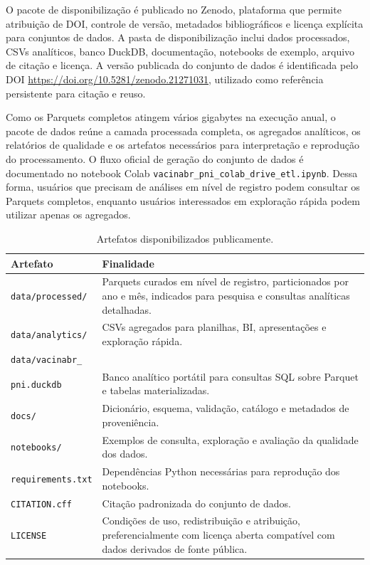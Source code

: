 \documentclass[12pt]{article}
\begin{document}
O pacote de disponibilização é publicado no Zenodo, plataforma que permite atribuição de DOI, controle de versão, metadados bibliográficos e licença explícita para conjuntos de dados. A pasta de disponibilização inclui dados processados, CSVs analíticos, banco DuckDB, documentação, notebooks de exemplo, arquivo de citação e licença. A versão publicada do conjunto de dados é identificada pelo DOI \url{https://doi.org/10.5281/zenodo.21271031}, utilizado como referência persistente para citação e reuso.

Como os Parquets completos atingem vários gigabytes na execução anual, o pacote de dados reúne a camada processada completa, os agregados analíticos, os relatórios de qualidade e os artefatos necessários para interpretação e reprodução do processamento. O fluxo oficial de geração do conjunto de dados é documentado no notebook Colab \texttt{vacinabr\_pni\_colab\_drive\_etl.ipynb}. Dessa forma, usuários que precisam de análises em nível de registro podem consultar os Parquets completos, enquanto usuários interessados em exploração rápida podem utilizar apenas os agregados.

\begin{table}[ht]
\centering
\caption{Artefatos disponibilizados publicamente.}
\label{tab:release-artifacts}
\begin{tabular}{p{4.8cm}p{6.4cm}}
\toprule
\textbf{Artefato} & \textbf{Finalidade} \\
\midrule
\texttt{data/processed/} & Parquets curados em nível de registro, particionados por ano e mês, indicados para pesquisa e consultas analíticas detalhadas. \\
\texttt{data/analytics/} & CSVs agregados para planilhas, BI, apresentações e exploração rápida. \\
\texttt{data/vacinabr\_}\\
\texttt{pni.duckdb} & Banco analítico portátil para consultas SQL sobre Parquet e tabelas materializadas. \\
\texttt{docs/} & Dicionário, esquema, validação, catálogo e metadados de proveniência. \\
\texttt{notebooks/} & Exemplos de consulta, exploração e avaliação da qualidade dos dados. \\
\texttt{requirements.txt} & Dependências Python necessárias para reprodução dos notebooks. \\
\texttt{CITATION.cff} & Citação padronizada do conjunto de dados. \\
\texttt{LICENSE} & Condições de uso, redistribuição e atribuição, preferencialmente com licença aberta compatível com dados derivados de fonte pública. \\
\bottomrule
\end{tabular}
\end{table}
\end{document}
